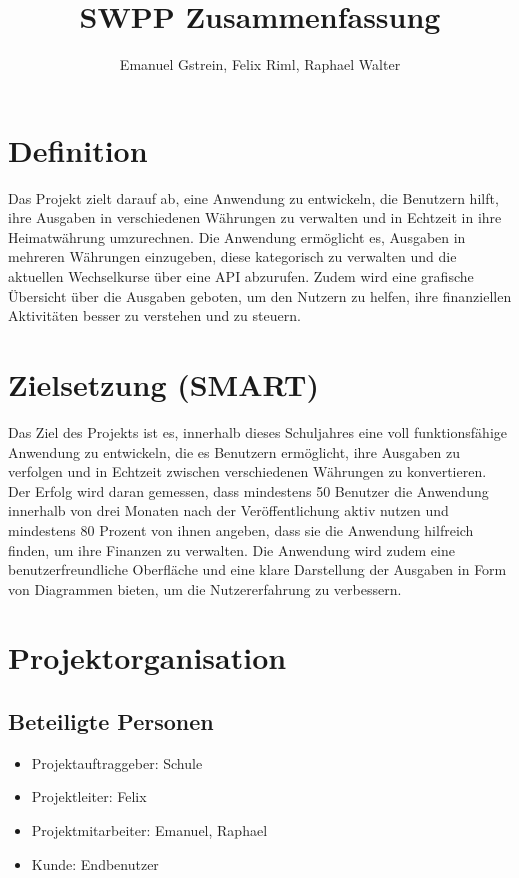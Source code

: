 \documentclass[ngerman]{report}
\title{SWPP Zusammenfassung}
\author{Emanuel Gstrein, Felix Riml, Raphael Walter}
\begin{document}
    \maketitle

    \newpage
    \tableofcontents
    \newpage

    \section{Definition}
    Das Projekt zielt darauf ab, eine Anwendung zu entwickeln, die Benutzern hilft, ihre Ausgaben in verschiedenen Währungen zu verwalten und in Echtzeit in ihre Heimatwährung umzurechnen. 
    Die Anwendung ermöglicht es, Ausgaben in mehreren Währungen einzugeben, diese kategorisch zu verwalten und die aktuellen Wechselkurse über eine API abzurufen. Zudem wird eine grafische 
    Übersicht über die Ausgaben geboten, um den Nutzern zu helfen, ihre finanziellen Aktivitäten besser zu verstehen und zu steuern.
    
    \section{Zielsetzung (SMART)}
    Das Ziel des Projekts ist es, innerhalb dieses Schuljahres
    eine voll funktionsfähige Anwendung zu entwickeln,
    die es Benutzern ermöglicht, ihre Ausgaben zu verfolgen
    und in Echtzeit zwischen verschiedenen Währungen zu konvertieren.
    Der Erfolg wird daran gemessen, dass mindestens 50 Benutzer
    die Anwendung innerhalb von drei Monaten nach der Veröffentlichung
    aktiv nutzen und mindestens 80 Prozent von ihnen angeben, dass sie die
    Anwendung hilfreich finden, um ihre Finanzen zu verwalten.
    Die Anwendung wird zudem eine benutzerfreundliche Oberfläche
    und eine klare Darstellung der Ausgaben in Form von Diagrammen bieten,
    um die Nutzererfahrung zu verbessern.

    \section{Projektorganisation}
    \subsection{Beteiligte Personen}
    \begin{itemize}
        \item Projektauftraggeber: Schule
        \item Projektleiter: Felix
        \item Projektmitarbeiter: Emanuel, Raphael
        \item Kunde: Endbenutzer
    \end{itemize}
\end{document}
